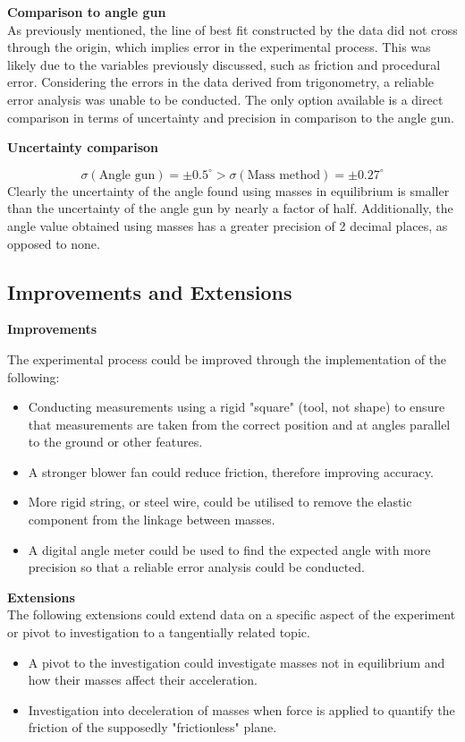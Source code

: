 \documentclass[11pt,a4paper]{article}
\begin{document}
	{\large
	\textbf{Comparison to angle gun}}\\
As previously mentioned, the line of best fit constructed by the data did not cross through the origin, which implies error in the experimental process. This was likely due to the variables previously discussed, such as friction and procedural error. 
Considering the errors in the data derived from trigonometry, a reliable error analysis was unable to be conducted. The only option available is a direct comparison in terms of uncertainty and precision in comparison to the angle gun.
\begin{center}
	\textbf{Uncertainty comparison}
\end{center}

$$\sigma(\textrm{Angle gun})=\pm0.5^\circ>\sigma(\textrm{Mass method})=\pm{0.27^\circ}$$
Clearly the uncertainty of the angle found using masses in equilibrium is smaller than the uncertainty of the angle gun by nearly a factor of half. Additionally, the angle value obtained using masses has a greater precision of 2 decimal places, as opposed to none.

\subsection{Improvements and Extensions}

	{\large
	\textbf{Improvements}\\}

	The experimental process could be improved through the implementation of the following:
\begin{itemize}
	\item Conducting measurements using a rigid "square" (tool, not shape) to ensure that measurements are taken from the correct position and at angles parallel to the ground or other features. 
	\item A stronger blower fan could reduce friction, therefore improving accuracy. 
	\item More rigid string, or steel wire, could be utilised to remove the elastic component from the linkage between masses.
	\item A digital angle meter could be used to find the expected angle with more precision so that a reliable error analysis could be conducted.
\end{itemize}

	{\large
	\textbf{Extensions}}\\
The following extensions could extend data on a specific aspect of the experiment or pivot to investigation to a tangentially related topic.
\begin{itemize}
	\item A pivot to the investigation could investigate masses not in equilibrium and how their masses affect their acceleration. 
	\item Investigation into deceleration of masses when force is applied to quantify the friction of the supposedly "frictionless" plane.
	
\end{itemize}
\end{document}
